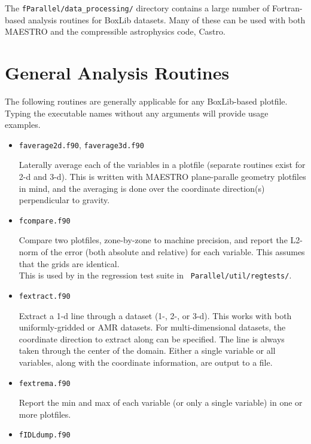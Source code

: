 The {\tt fParallel/data\_processing/} directory contains a large
number of Fortran-based analysis routines for BoxLib datasets.  Many
of these can be used with both MAESTRO and the compressible
astrophysics code, Castro.


\section{General Analysis Routines}

The following routines are generally applicable for any BoxLib-based
plotfile.  Typing the executable names without any arguments will
provide usage examples.

\begin{itemize}

\item {\tt faverage2d.f90}, {\tt faverage3d.f90}

  Laterally average each of the variables in a plotfile (separate
  routines exist for 2-d and 3-d).  This is written with MAESTRO
  plane-paralle geometry plotfiles in mind, and the averaging is done
  over the coordinate direction(s) perpendicular to gravity.


\item {\tt fcompare.f90}

  Compare two plotfiles, zone-by-zone to machine precision, and report
  the L2-norm of the error (both absolute and relative) for each
  variable.  This assumes that the grids are identical. \\[-3mm]

  This is used by in the regression test suite in {\tt
  Parallel/util/regtests/}.


\item {\tt fextract.f90}

  Extract a 1-d line through a dataset (1-, 2-, or 3-d).  This works
  with both uniformly-gridded or AMR datasets.  For multi-dimensional
  datasets, the coordinate direction to extract along can be specified.
  The line is always taken through the center of the domain.  Either
  a single variable or all variables, along with the coordinate 
  information, are output to a file.
  

\item {\tt fextrema.f90}

  Report the min and max of each variable (or only a single variable)
  in one or more plotfiles.


\item {\tt fIDLdump.f90}


\end{itemize}
